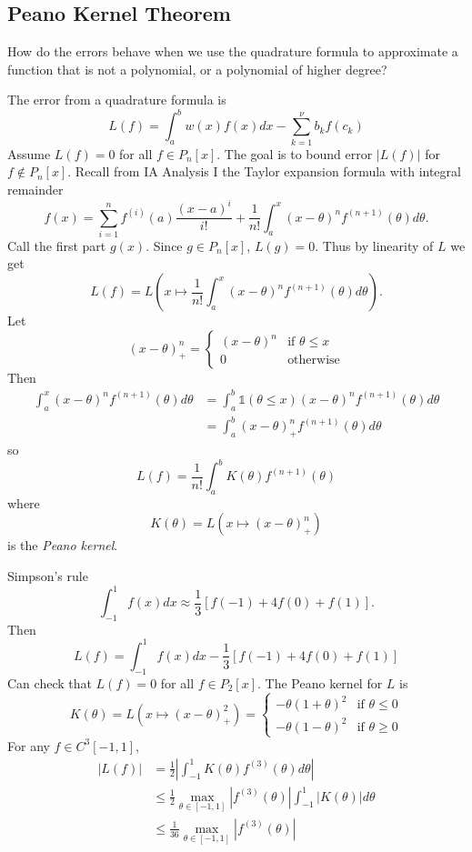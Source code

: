 \documentclass[a4paper]{article}
\begin{document}
\subsection{Peano Kernel Theorem}

How do the errors behave when we use the quadrature formula to approximate a function that is not a polynomial, or a polynomial of higher degree?

The error from a quadrature formula is
\[
  L(f) = \int_a^b w(x)f(x) dx - \sum_{k = 1}^\nu b_kf(c_k)
\]
Assume \(L(f) = 0\) for all \(f \in P_n[x]\). The goal is to bound error \(|L(f)|\) for \(f \notin P_n[x]\). Recall from IA Analysis I the Taylor expansion formula with integral remainder
\[
  f(x) = \sum_{i = 1}^n f^{(i)}(a) \frac{(x - a)^i}{i!} + \frac{1}{n!} \int_a^x (x - \theta)^n f^{(n + 1)}(\theta) d\theta.
\]
Call the first part \(g(x)\). Since \(g \in P_n[x]\), \(L(g) = 0\). Thus by linearity of \(L\) we get
\[
  L(f) = L\left( x \mapsto \frac{1}{n!} \int_a^x (x - \theta)^n f^{(n + 1)}(\theta) d\theta \right).
\]
Let
\[
  (x - \theta)_+^n =
  \begin{cases}
    (x - \theta)^n & \text{if } \theta \leq x \\
    0 & \text{otherwise}
  \end{cases}
\]
Then
\begin{align*}
  \int_a^x (x - \theta)^n f^{(n + 1)}(\theta) d\theta & = \int_a^b \mathbb{1}(\theta \leq x) (x - \theta)^n f^{(n + 1)}(\theta) d\theta \\
                                                      &= \int_a^b (x - \theta)_+^n f^{(n + 1)}(\theta) d\theta
\end{align*}
so
\[
  L(f) = \frac{1}{n!} \int_a^b K(\theta)f^{(n + 1)}(\theta)
\]
where
\[
  K(\theta) = L(x \mapsto (x - \theta)_+^n)
\]
is the \emph{Peano kernel}.

\begin{eg}
  Simpson's rule
  \[
    \int_{-1}^1 f(x)dx \approx \frac{1}{3} [f(-1) + 4f(0) + f(1)].
  \]
  Then
  \[
    L(f) = \int_{-1}^1 f(x)dx - \frac{1}{3}[f(-1) + 4f(0) + f(1)]
  \]
  Can check that \(L(f) = 0\) for all \(f \in P_2[x]\). The Peano kernel for \(L\) is
  \[
    K(\theta) = L(x \mapsto (x - \theta)_+^2) =
    \begin{cases}
      -\theta(1 + \theta)^2 & \text{if } \theta \leq 0 \\
      -\theta(1 - \theta)^2 & \text{if } \theta \geq 0
    \end{cases}
  \]
  For any \(f \in C^3[-1, 1]\),
  \begin{align*}
    |L(f)| &= \frac{1}{2}\left| \int_{-1}^1 K(\theta)f^{(3)}(\theta)d\theta \right| \\
           &\leq \frac{1}{2} \max_{\theta \in [-1, 1]} |f^{(3)}(\theta)| \int_{-1}^1|K(\theta)| d\theta \\
    &\leq \frac{1}{36} \max_{\theta \in [-1, 1]} |f^{(3)}(\theta)|
  \end{align*}
\end{eg}







\printindex

\iffalse
http://damtp.cam.ac.uk/user/hf323/L18-IB-NA/
\fi
\end{document}
